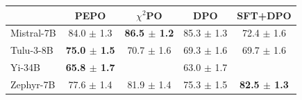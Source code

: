 \small
\begin{tabular}{lcccc}
\toprule
 & PEPO & $\chi^2$PO & DPO & SFT+DPO \\
\midrule
Mistral-7B & 84.0 $\pm$ 1.3 & \textbf{86.5 $\pm$ 1.2} & 85.3 $\pm$ 1.3 & 72.4 $\pm$ 1.6 \\
Tulu-3-8B & \textbf{75.0 $\pm$ 1.5} & 70.7 $\pm$ 1.6 & 69.3 $\pm$ 1.6 & 69.7 $\pm$ 1.6 \\
Yi-34B & \textbf{65.8 $\pm$ 1.7} &  & 63.0 $\pm$ 1.7 &  \\
Zephyr-7B & 77.6 $\pm$ 1.4 & 81.9 $\pm$ 1.4 & 75.3 $\pm$ 1.5 & \textbf{82.5 $\pm$ 1.3} \\
\bottomrule
\end{tabular}
